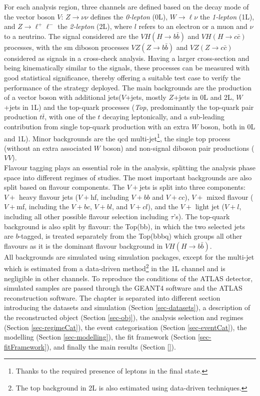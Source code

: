 For each analysis region, three channels are defined based on the decay mode of the vector boson $V$: $Z \rightarrow \nu \nu$ defines the \textit{0-lepton} (0L), $W \rightarrow \ell \nu $ the \textit{1-lepton} (1L), and $Z \rightarrow\ell^+\ell^-$ the \textit{2-lepton} (2L), where $l$ refers to an electron or a muon and $\nu$ to a neutrino. The signal considered are the  $VH (H\rightarrow b\bar{b})$ and $VH (H\rightarrow c\bar{c})$ processes, with the \gls{sm} diboson processes $VZ (Z\rightarrow b\bar{b})$ and $VZ (Z\rightarrow c\bar{c})$ considered as signals in a cross-check analysis. Having a larger cross-section and being kinematically similar to the signals, these processes can be measured with good statistical significance, thereby offering a suitable test case to verify the performance of the strategy deployed. The main backgrounds are the production of a vector boson with additional jets($V$+jets, mostly $Z$+jets in 0L and 2L, $W$+jets in 1L) and the top-quark processes (\textit{Top}, predominantly the top-quark pair production $t\bar{t}$, with one of the $t$ decaying leptonically, and a sub-leading contribution from single top-quark production with an extra $W$ boson, both in 0L and 1L). Minor backgrounds are the \gls{qcd} multi-jet\footnote{Thanks to the required presence of leptons in the final state.}, the single top process (without an extra associated $W$ boson) and non-signal diboson pair productions ($VV$). \\ 

Flavour tagging plays an essential role in the analysis, splitting the analysis phase space into different regimes of studies. The most important backgrounds are also split based on flavour components. The $V+$jets is split into three components: $V+$ heavy flavour jets ($V+$hf, including $V+bb$ and $V+cc$), $V+$ mixed flavour ($V+$mf, including the $V+bc$, $V+bl$, and $V+cl$), and the $V+$ light jet ($V+l$, including all other possible flavour selection including $\tau$'s). The top-quark background is also split by flavour: the Top(bb), in which the two selected jets are $b$-tagged, is treated separately from the Top(bbbq) which groups all other flavours as it is the dominant flavour background in $VH(H\rightarrow b\bar{b})$. \\

All backgrounds are simulated using  simulation packages, except for the multi-jet which is estimated from a data-driven method\footnote{The top background in 2L is also estimated using data-driven techniques.} in the 1L channel and is negligible in other channels. To reproduce the conditions of the ATLAS detector, simulated samples are passed through the GEANT4 software \cite{Agostinelli:602040} and the ATLAS reconstruction software. The chapter is separated into different section introducing the datasets and simulation (Section \ref{sec-datasets}), a description of the reconstructed object (Section \ref{sec-obj}), the analysis selection and regimes (Section \ref{sec-regimeCat}), the event categorisation (Section \ref{sec-eventCat}), the modelling (Section \ref{sec-modelling}), the fit framework (Section \ref{sec-fitFramework}), and finally the main results (Section \ref{}).

